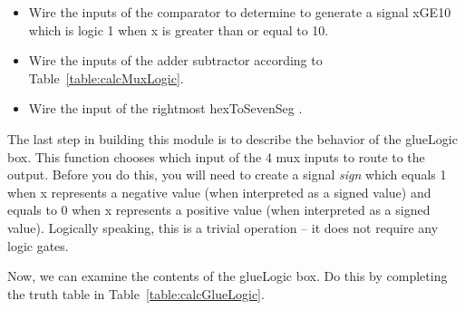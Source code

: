 \begin{itemize}
\item
  Wire the inputs of the comparator to determine to generate a signal
  xGE10 which is logic 1 when x is greater than or equal to 10.
\item
  Wire the inputs of the adder subtractor according to Table~\ref{table:calcMuxLogic}.
\item
  Wire the input of the rightmost hexToSevenSeg .
\end{itemize}

The last step in building this module is to describe the behavior of the
glueLogic box. This function chooses which input of the 4 mux inputs to
route to the output. Before you do this, you will need to create a
signal \emph{sign} which equals 1 when x represents a negative value
(when interpreted as a signed value) and equals to 0 when x represents a
positive value (when interpreted as a signed value). Logically speaking,
this is a trivial operation -- it does not require any logic gates.

Now, we can examine the contents of the glueLogic box. Do this by
completing the truth table in Table~\ref{table:calcGlueLogic}.

